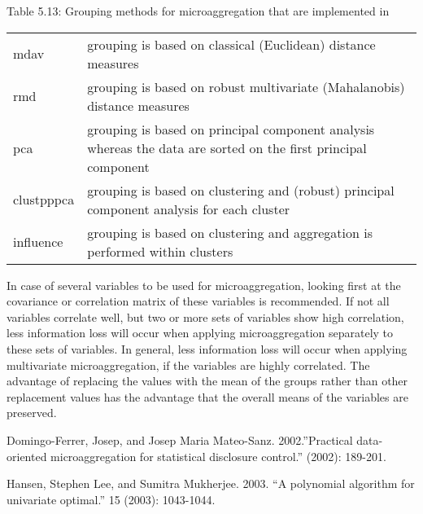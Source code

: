 \documentclass[letterpaper,10pt,english]{sphinxmanual}
\begin{document}
Table 5.13: Grouping methods for microaggregation that are implemented
in 


\begin{savenotes}\sphinxattablestart
\centering
\begin{tabulary}{\linewidth}[t]{|T|T|}
\hline
\sphinxstyletheadfamily 
{}
&\sphinxstyletheadfamily 
{}
\\
\hline
mdav
&
grouping is based on classical
(Euclidean) distance measures
\\
\hline
rmd
&
grouping is based on robust
multivariate (Mahalanobis)
distance measures
\\
\hline
pca
&
grouping is based on principal
component analysis whereas the
data are sorted on the first
principal component
\\
\hline
clustpppca
&
grouping is based on clustering
and (robust) principal component
analysis for each cluster
\\
\hline
influence
&
grouping is based on clustering
and aggregation is performed
within clusters
\\
\hline
\end{tabulary}
\par
\sphinxattableend\end{savenotes}

In case of several variables to be used for microaggregation, looking
first at the covariance or correlation matrix of these variables is
recommended. If not all variables correlate well, but two or more sets
of variables show high correlation, less information loss will occur
when applying microaggregation separately to these sets of variables. In
general, less information loss will occur when applying multivariate
microaggregation, if the variables are highly correlated. The advantage
of replacing the values with the mean of the groups rather than other
replacement values has the advantage that the overall means of the
variables are preserved.


Domingo-Ferrer, Josep, and Josep Maria Mateo-Sanz. 2002.”Practical
data-oriented microaggregation for statistical disclosure control.”
 (2002):
189-201.

Hansen, Stephen Lee, and Sumitra Mukherjee. 2003. “A polynomial
algorithm for univariate optimal.”  15 (2003): 1043-1044.
\end{document}
